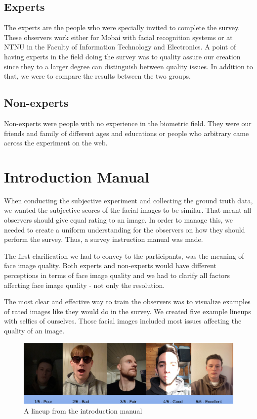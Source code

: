 \subsection*{Experts}
The experts are the people who were specially invited to complete the survey. These observers work either for Mobai with facial recognition systems or at NTNU in the Faculty of Information Technology and Electronics. A point of having experts in the field doing the survey was to quality assure our creation since they to a larger degree can distinguish between quality issues. In addition to that, we were to compare the results between the two groups. 

\subsection*{Non-experts}
Non-experts were people with no experience in the biometric field. They were our friends and family of different ages and educations or people who arbitrary came across the experiment on the web. 

\section{Introduction Manual}
\label{sec:intromanual}
When conducting the subjective experiment and collecting the ground truth data, we wanted the subjective scores of the facial images to be similar. That meant all observers should give equal rating to an image. In order to manage this, we needed to create a uniform understanding for the observers on how they should perform the survey. Thus, a survey instruction manual was made. 

The first clarification we had to convey to the participants, was the meaning of face image quality. Both experts and non-experts would have different perceptions in terms of face image quality and we had to clarify all factors affecting face image quality - not only the resolution. 

The most clear and effective way to train the observers was to visualize examples of rated images like they would do in the survey. We created five example lineups with selfies of ourselves. Those facial images included most issues affecting the quality of an image. 

\begin{figure}[h]
    \centering
    \includegraphics[scale = 0.23]{figures/Example-lineup.png}
    \caption{A lineup from the introduction manual}
    \label{fig:example-manual}
\end{figure}


